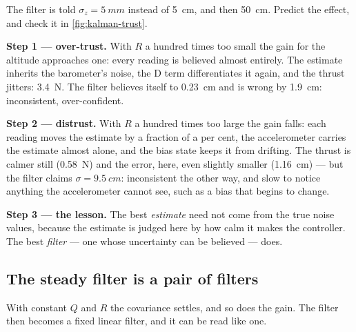 \begin{example}
\label{ex:kalman-trust}
The filter is told $\sigma_z = \SI{5}{mm}$ instead of \SI{5}{cm}, and then \SI{50}{cm}. Predict the effect, and check it in \cref{fig:kalman-trust}.

\textbf{Step 1 — over-trust.} With $R$ a hundred times too small the gain for the altitude approaches one: every reading is believed almost entirely. The estimate inherits the barometer's noise, the D term differentiates it again, and the thrust jitters: \SI{3.4}{N}. The filter believes itself to \SI{0.23}{cm} and is wrong by \SI{1.9}{cm}: inconsistent, over-confident.

\textbf{Step 2 — distrust.} With $R$ a hundred times too large the gain falls: each reading moves the estimate by a fraction of a per cent, the accelerometer carries the estimate almost alone, and the bias state keeps it from drifting. The thrust is calmer still (\SI{0.58}{N}) and the error, here, even slightly smaller (\SI{1.16}{cm}) — but the filter claims $\sigma = \SI{9.5}{cm}$: inconsistent the other way, and slow to notice anything the accelerometer cannot see, such as a bias that begins to change.

\textbf{Step 3 — the lesson.} The best \emph{estimate} need not come from the true noise values, because the estimate is judged here by how calm it makes the controller. The best \emph{filter} — one whose uncertainty can be believed — does.
\end{example}

\subsection{The steady filter is a pair of filters}
With constant $Q$ and $R$ the covariance settles, and so does the gain. The filter then becomes a fixed linear filter, and it can be read like one.

